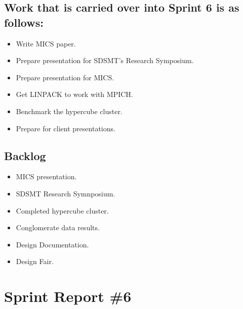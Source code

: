 \subsection*{Work that is carried over into Sprint 6 is as follows:}
\begin{itemize}
	\item Write MICS paper.
	\item Prepare presentation for SDSMT's Research Symposium.
	\item Prepare presentation for MICS.
	\item Get LINPACK to work with MPICH.
	\item Benchmark the hypercube cluster.
	\item Prepare for client presentations.
\end{itemize}

\subsection*{Backlog}
\begin{itemize}
	\item MICS presentation.
	\item SDSMT Research Symnposium.
	\item Completed hypercube cluster.
	\item Conglomerate data results.
	\item Design Documentation.
	\item Design Fair.
\end{itemize}

\section{Sprint Report \#6}

